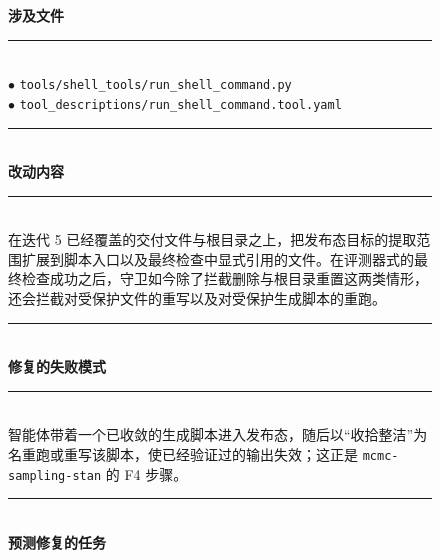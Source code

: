 \begin{figure}[t]
    \centering
    \scriptsize
    \begin{tcbraster}[raster columns=2,
                      raster equal height,
                      raster column skip=4pt,
                      raster row skip=0pt,
                      raster left skip=0pt,
                      raster right skip=0pt,
                      boxrule=0.6pt,
                      left=4pt,right=4pt,top=3pt,bottom=3pt,
                      coltitle=white]
        \begin{tcolorbox}[colback=aheSky!18,colframe=aheNavy,colbacktitle=aheNavy,
                          title={\scriptsize\textbf{chg-1，迭代 6，commit \texttt{ff0cf3d}，层级：工具实现}}]
            \textbf{\textcolor{aheNavy}{涉及文件}} \\
            \rule{\linewidth}{0.3pt}\\[1pt]
            $\bullet$ \texttt{tools/shell\_tools/run\_shell\_command.py} \\
            $\bullet$ \texttt{tool\_descriptions/run\_shell\_command.tool.yaml} \\[3pt]
            \rule{\linewidth}{0.3pt}\\
            \textbf{\textcolor{aheNavy}{改动内容}} \\
            \rule{\linewidth}{0.3pt}\\[1pt]
            在迭代 5 已经覆盖的交付文件与根目录之上，把发布态目标的提取范围扩展到脚本入口以及最终检查中显式引用的文件。在评测器式的最终检查成功之后，守卫如今除了拦截删除与根目录重置这两类情形，还会拦截对受保护文件的重写以及对受保护生成脚本的重跑。 \\[3pt]
            \rule{\linewidth}{0.3pt}\\
            \textbf{\textcolor{aheNavy}{修复的失败模式}} \\
            \rule{\linewidth}{0.3pt}\\[1pt]
            智能体带着一个已收敛的生成脚本进入发布态，随后以``收拾整洁''为名重跑或重写该脚本，使已经验证过的输出失效；这正是 \texttt{mcmc-sampling-stan} 的 F4 步骤。 \\[3pt]
            \rule{\linewidth}{0.3pt}\\
            \textbf{\textcolor{aheNavy}{预测修复的任务}} \\

\end{tcolorbox}
\end{tcbraster}
\end{figure}
